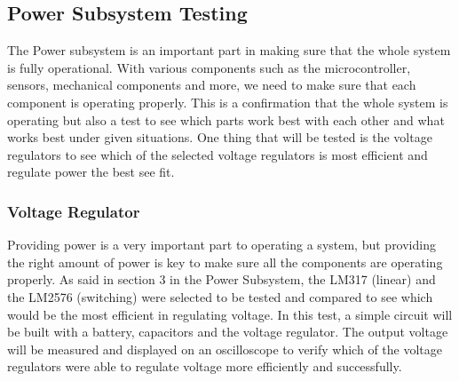 \subsection{Power Subsystem Testing}
\label{sec:power_subsystem_testing}
The Power subsystem is an important part in making sure that the whole system is fully operational. With various components such as the microcontroller, sensors, mechanical components and more, we need to make sure that each component is operating properly. This is a confirmation that the whole system is operating but also a test to see which parts work best with each other and what works best under given situations. One thing that will be tested is the voltage regulators to see which of the selected voltage regulators is most efficient and regulate power the best see fit.	\par
\subsubsection{Voltage Regulator}
Providing power is a very important part to operating a system, but providing the right amount of power is key to make sure all the components are operating properly. As said in section 3 in the Power Subsystem, the LM317 (linear) and the LM2576 (switching) were selected to be tested and compared to see which would be the most efficient in regulating voltage. In this test, a simple circuit will be built with a battery, capacitors and the voltage regulator. The output voltage will be measured and displayed on an oscilloscope to verify which of the voltage regulators were able to regulate voltage more efficiently and successfully. \par 
